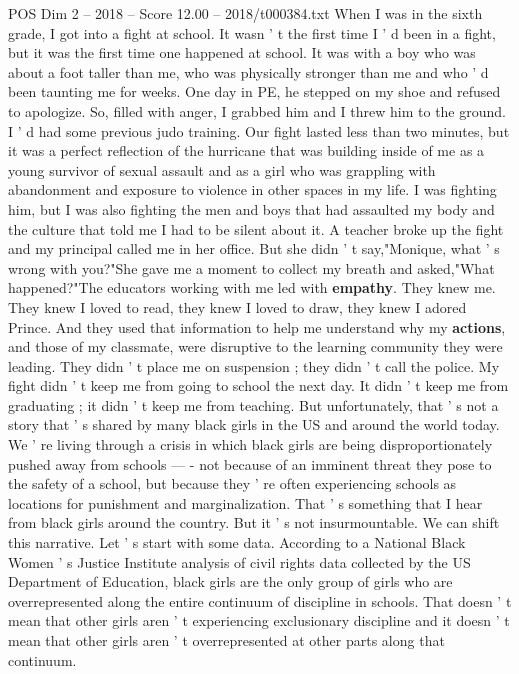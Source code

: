 \begin{textsample}{POS Dim 2 – 2018 – Score 12.00 – 2018/t000384.txt}  \label{ex:f2_pos_052}
When I was in the sixth grade, I got into a fight at school.
It wasn ' t the first time I ' d been in a fight, but it was the first time one happened at school.
It was with a boy who was about a foot taller than me, who was physically stronger than me and who ' d been taunting me for weeks.
One day in PE, he stepped on my shoe and refused to apologize.
So, filled with anger, I grabbed him and I threw him to the ground.
I ' d had some previous judo training.
Our fight lasted less than two minutes, but it was a perfect reflection of the hurricane that was building inside of me as a young survivor of sexual assault and as a girl who was grappling with abandonment and exposure to violence in other spaces in my life.
I was fighting him, but I was also fighting the men and boys that had assaulted my body and the culture that told me I had to be silent about it.
A teacher broke up the fight and my principal called me in her office.
But she didn ' t say,"Monique, what ' s wrong with you?"She gave me a moment to collect my breath and asked,"What happened?"The educators working with me led with \textbf{empathy}.
They knew me.
They knew I loved to read, they knew I loved to draw, they knew I adored Prince.
And they used that information to help me understand why my \textbf{actions}, and those of my classmate, were disruptive to the learning community they were leading.
They didn ' t place me on suspension ; they didn ' t call the police.
My fight didn ' t keep me from going to school the next day.
It didn ' t keep me from graduating ; it didn ' t keep me from teaching.
But unfortunately, that ' s not a story that ' s shared by many black girls in the US and around the world today.
We ' re living through a crisis in which black girls are being disproportionately pushed away from schools — - not because of an imminent threat they pose to the safety of a school, but because they ' re often experiencing schools as locations for punishment and marginalization.
That ' s something that I hear from black girls around the country.
But it ' s not insurmountable.
We can shift this narrative.
Let ' s start with some data.
According to a National Black Women ' s Justice Institute analysis of civil rights data collected by the US Department of Education, black girls are the only group of girls who are overrepresented along the entire continuum of discipline in schools.
That doesn ' t mean that other girls aren ' t experiencing exclusionary discipline and it doesn ' t mean that other girls aren ' t overrepresented at other parts along that continuum.

\end{textsample}
